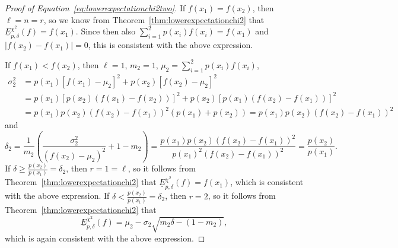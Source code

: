 \documentclass{article}
\begin{document}
\begin{proof}[Proof of Equation~\eqref{eq:lowerexpectationchi2two}]
If $f(x_1)=f(x_2)$, then $\ell=n=r$, so we know from Theorem~\ref{thm:lowerexpectationchi2} that $\underline{E}^{\chi^2}_{p,\delta}(f)=f(x_1)$. Since then also $\sum_{i=1}^2p(x_i)f(x_i)=f(x_1)$ and $\vert f(x_2)-f(x_1)\vert=0$, this is consistent with the above expression. 

If $f(x_1)<f(x_2)$, then $\ell=1$, $m_2=1$, $\mu_2=\sum_{i=1}^2p(x_i)f(x_i)$, 
\begin{align*}
\sigma_2^2
&=p(x_1)[f(x_1)-\mu_2]^2+p(x_2)[f(x_2)-\mu_2]^2\\
&=p(x_1)\left[p(x_2)(f(x_1)-f(x_2))\right]^2+p(x_2)\left[p(x_1)(f(x_2)-f(x_1))\right]^2\\
&=p(x_1)p(x_2)(f(x_2)-f(x_1))^2(p(x_1)+p(x_2))=p(x_1)p(x_2)(f(x_2)-f(x_1))^2
\end{align*}
and
\begin{equation*}
    \delta_2=\frac{1}{m_2}\left(\frac{\sigma_2^2}{(f(x_2)-\mu_2)^2}+1-m_2\right)=\frac{p(x_1)p(x_2)(f(x_2)-f(x_1))^2}{p(x_1)^2(f(x_2)-f(x_1))^2}=\frac{p(x_2)}{p(x_1)}.
\end{equation*}
If $\delta\geq\frac{p(x_2)}{p(x_1)}=\delta_2$, then $r=1=\ell$, so it follows from Theorem~\ref{thm:lowerexpectationchi2} that $\underline{E}^{\chi^2}_{p,\delta}(f)=f(x_1)$, which is consistent with the above expression. If $\delta<\frac{p(x_2)}{p(x_1)}=\delta_2$, then $r=2$, so it follows from Theorem~\ref{thm:lowerexpectationchi2} that
\begin{equation*}
\underline{E}^{\chi^2}_{p,\delta}(f)
=\mu_2-\sigma_2\sqrt{m_2\delta-(1-m_2)},
\end{equation*}
which is again consistent with the above expression.
\end{proof}
\end{document}
